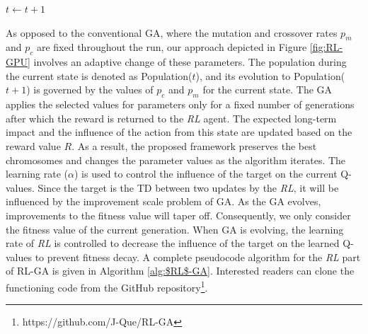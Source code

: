 \documentclass[acmsmall]{acmart}
\newcommand{\RL}{$RL$}
\begin{document}
\begin{algorithm}[h]
\begin{algorithmic}[h]
               
                
                \State \quad \quad \quad \quad \quad \quad {}
                \State $t \leftarrow t+1$
                    \EndWhile
                    
                \EndWhile
                \EndFunction
    \end{algorithmic}
\end{algorithm}

As opposed to the conventional GA, where the mutation and crossover rates $p_m$ and $p_c$ are fixed throughout the run, our approach depicted in Figure \ref{fig:RL-GPU} involves an adaptive change of these parameters. The population during the current state is denoted as Population($t$), and its evolution to Population($t+1$) is governed by the values of $p_c$ and $p_m$ for the current state. The GA applies the selected values for parameters only for a fixed number of generations after which the reward is returned to the \textit{RL} agent. The expected long-term impact and the influence of the action from this state are updated based on the reward value $R$. As a result, the proposed framework preserves the best chromosomes and changes the parameter values as the algorithm iterates. The learning rate ($\alpha$) is used to control the influence of the target on the current Q-values. Since the target is the TD between two updates by the \textit{RL}, it will be influenced by the improvement scale problem of GA. As the GA evolves, improvements to the fitness value will taper off. Consequently, we only consider the fitness value of the current generation. When GA is evolving, the learning rate of \textit{RL} is controlled to decrease the influence of the target on the learned Q-values to prevent fitness decay. A complete pseudocode algorithm for the \textit{RL} part of RL-GA is given in Algorithm \ref{alg:\RL-GA}. Interested readers can clone the functioning code from the GitHub repository\footnote{https://github.com/J-Que/RL-GA}.
\end{document}
